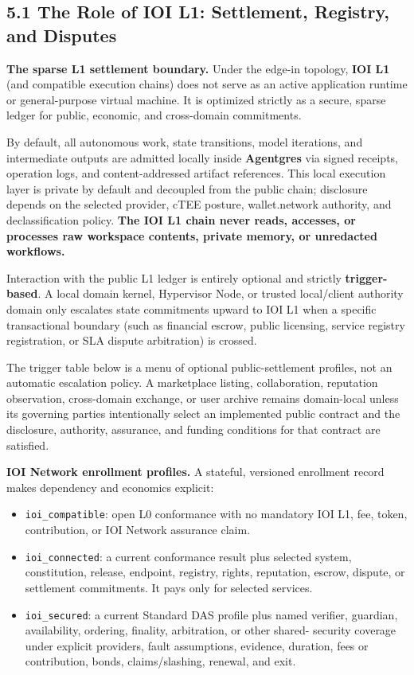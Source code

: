 \documentclass[
  11pt,
]{article}
\providecommand{\tightlist}{%
  \setlength{\itemsep}{0pt}\setlength{\parskip}{0pt}}
\begin{document}
\hypertarget{the-role-of-ioi-l1-settlement-registry-and-disputes}{%
\subsection{5.1 The Role of IOI L1: Settlement, Registry, and
Disputes}\label{the-role-of-ioi-l1-settlement-registry-and-disputes}}

\textbf{The sparse L1 settlement boundary.} Under the edge-in topology,
\textbf{IOI L1} (and compatible execution chains) does not serve as an
active application runtime or general-purpose virtual machine. It is
optimized strictly as a secure, sparse ledger for public, economic, and
cross-domain commitments.

By default, all autonomous work, state transitions, model iterations,
and intermediate outputs are admitted locally inside \textbf{Agentgres} via
signed receipts, operation logs, and content-addressed artifact
references. This local execution layer is private by default and
decoupled from the public chain; disclosure depends on the selected
provider, cTEE posture, wallet.network authority, and declassification
policy. \textbf{The IOI L1 chain never reads, accesses, or processes raw
workspace contents, private memory, or unredacted workflows.}

Interaction with the public L1 ledger is entirely optional and strictly
\textbf{trigger-based}. A local domain kernel, Hypervisor Node, or
trusted local/client authority domain only escalates state commitments
upward to IOI L1 when a specific transactional boundary (such as
financial escrow, public licensing, service registry registration, or
SLA dispute arbitration) is crossed.

The trigger table below is a menu of optional public-settlement profiles,
not an automatic escalation policy. A marketplace listing, collaboration,
reputation observation, cross-domain exchange, or user archive remains
domain-local unless its governing parties intentionally select an
implemented public contract and the disclosure, authority, assurance, and
funding conditions for that contract are satisfied.

\textbf{IOI Network enrollment profiles.} A stateful, versioned enrollment
record makes dependency and economics explicit:

\begin{itemize}
\tightlist
\item
  \texttt{ioi\_compatible}: open L0 conformance with no mandatory IOI L1,
  fee, token, contribution, or IOI Network assurance claim.
\item
  \texttt{ioi\_connected}: a current conformance result plus selected system,
  constitution, release, endpoint, registry, rights, reputation, escrow,
  dispute, or settlement commitments. It pays only for selected services.
\item
  \texttt{ioi\_secured}: a current Standard DAS profile plus named verifier,
  guardian, availability, ordering, finality, arbitration, or other shared-
  security coverage under explicit providers, fault assumptions, evidence,
  duration, fees or contribution, bonds, claims/slashing, renewal, and exit.
\end{itemize}
\end{document}
